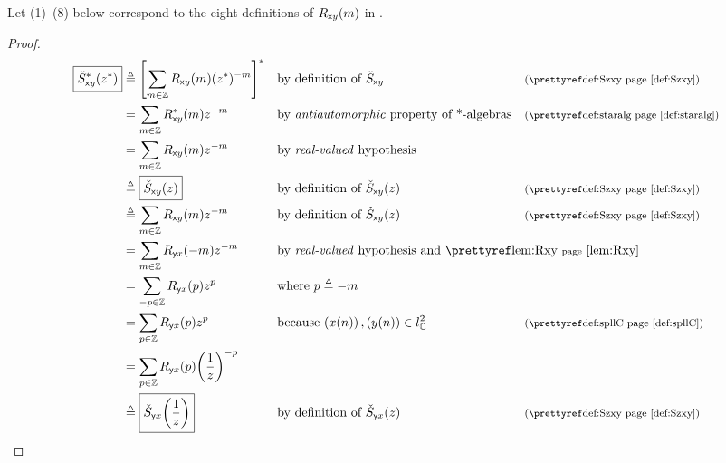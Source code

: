 \begin{proposition}
\label{prop:Szxy_realxy}
Let (1)--(8) below correspond to the eight definitions of $R_{{\mathsf xy}}(m)$ in .
\end{proposition}
\begin{proof}
\begin{align*}
  \boxed{\Szxy^\ast\brp{z^\ast}}
    &\eqd \brs{\sum_{m\in\Z}\Rxy(m) (z^\ast)^{-m}}^\ast
    && \text{by definition of $\Szxy$}                             && \text{\xref{def:Szxy}}
  \\&= \sum_{m\in\Z}\Rxy^\ast(m) z^{-m}
    && \text{by \prope{antiautomorphic} property of *-algebras}    && \text{\xref{def:staralg}}
  \\&= \sum_{m\in\Z}\Rxy(m) z^{-m}
    && \text{by \prope{real-valued} hypothesis}
  \\&\eqd \boxed{\Szxy(z)}
    && \text{by definition of $\Szxy(z)$}                          && \text{\xref{def:Szxy}}
  \\&\eqd \sum_{m\in\Z}\Rxy(m) z^{-m}
    && \text{by definition of $\Szxy(z)$}                          && \text{\xref{def:Szxy}}
  \\&= \sum_{m\in\Z} \Ryx(-m) z^{-m}
    && \mathrlap{\text{by \prope{real-valued} hypothesis and \prefp{lem:Rxy}}}
  \\&= \sum_{-p\in\Z} \Ryx(p) z^{p}
    && \text{where $p\eqd-m$}
  \\&= \sum_{p\in\Z} \Ryx(p) z^{p}
    && \text{because $\seqn{\rvx(n)},\seqn{\rvy(n)}\in\spllC$}     && \text{\xref{def:spllC}}
  \\&= \sum_{p\in\Z} \Ryx(p) \brp{\frac{1}{z}}^{-p}
  \\&\eqd \boxed{\Szyx\brp{\frac{1}{z}}}
    && \text{by definition of $\Szyx(z)$}                          && \text{\xref{def:Szxy}}
\end{align*}
\end{proof}

